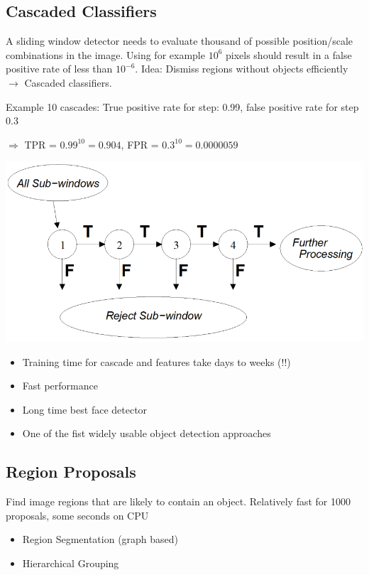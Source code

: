 \subsection{Cascaded Classifiers}
\begin{minipage}{0.5\textwidth}
    A sliding window detector needs to evaluate thousand of possible position/scale combinations in the image.
    Using for example $10^6$ pixels should result in a false positive rate of less than $10^{-6}$.
    Idea: Dismiss regions without objects efficiently $\rightarrow$ Cascaded classifiers.

    Example 10 cascades: True positive rate for step: 0.99, false positive rate for step 0.3

    $\Rightarrow$ TPR = $0.99^{10}=0.904$, FPR = $0.3^{10}=0.0000059$
\end{minipage}
\begin{minipage}{0.5\textwidth}
    \includegraphics[width=1\textwidth]{sections/FindingMultipleObjects/img/cascaded_classifier.png}
\end{minipage}
\begin{itemize}
    \item Training time for cascade and features take days to weeks (!!)
    \item Fast performance
    \item Long time best face detector
    \item One of the fist widely usable object detection approaches
\end{itemize}

\subsection{Region Proposals}
Find image regions that are likely to contain an object.
Relatively fast for 1000 proposals, some seconds on CPU
\begin{itemize}
    \item Region Segmentation (graph based)
    \item Hierarchical Grouping
\end{itemize}

